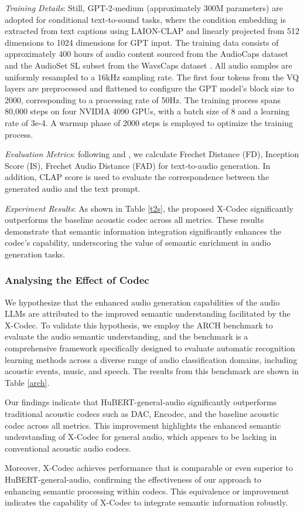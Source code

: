 {\emph{Training Details}}: 
Still, GPT-2-medium (approximately 300M parameters) are adopted for conditional text-to-sound tasks, where the condition embedding is extracted from text captions using LAION-CLAP \cite{wu2023large} and linearly projected from 512 dimensions to 1024 dimensions for GPT input. The training data consists of approximately 400 hours of audio content sourced from the AudioCaps dataset \cite{kim2019audiocaps} and the AudioSet SL subset from the WavsCaps dataset \cite{mei2024wavcaps}. All audio samples are uniformly resampled to a 16kHz sampling rate. The first four tokens from the VQ layers are preprocessed and flattened to configure the GPT model's block size to 2000, corresponding to a processing rate of 50Hz. The training process spans 80,000 steps on four NVIDIA 4090 GPUs, with a batch size of 8 and a learning rate of 3e-4. A warmup phase of 2000 steps is employed to optimize the training process.

{\emph{Evaluation Metrics}}:
following \cite{huang2023make} and \cite{liu2023audioldm}, we calculate Frechet Distance (FD), Inception Score (IS), Frechet Audio Distance (FAD) for text-to-audio generation. In addition, CLAP score \cite{huang2023make} is used to evaluate the correspondence between the generated audio and the text prompt.

{\emph{Experiment Results}}:
As shown in Table \ref{t2s}, the proposed X-Codec significantly outperforms the baseline acoustic codec across all metrics. These results demonstrate that semantic information integration significantly enhances the codec's capability, underscoring the value of semantic enrichment in audio generation tasks.

\subsubsection{Analysing the Effect of Codec}
We hypothesize that the enhanced audio generation capabilities of the audio LLMs are attributed to the improved semantic understanding facilitated by the X-Codec. To validate this hypothesis, we employ the ARCH benchmark \cite{la2024benchmarking} to evaluate the audio semantic understanding, and the benchmark is a comprehensive framework specifically designed to evaluate automatic recognition learning methods across a diverse range of audio classification domains, including acoustic events, music, and speech. The results from this benchmark are shown in Table \ref{arch}.

Our findings indicate that HuBERT-general-audio significantly outperforms traditional acoustic codecs such as DAC, Encodec, and the baseline acoustic codec across all metrics. This improvement highlights the enhanced semantic understanding of X-Codec for general audio, which appears to be lacking in conventional acoustic audio codecs.

Moreover, X-Codec achieves performance that is comparable or even superior to HuBERT-general-audio, confirming the effectiveness of our approach to enhancing semantic processing within codecs. This equivalence or improvement indicates the capability of X-Codec to integrate semantic information robustly.